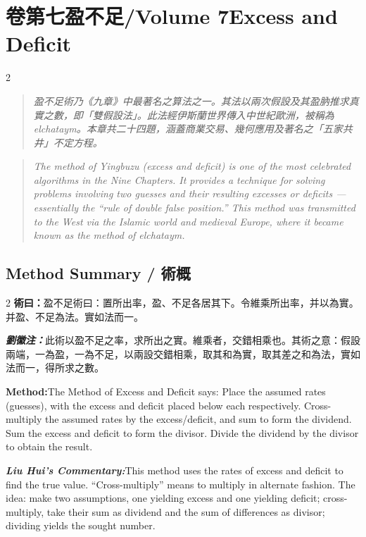 \documentclass[11pt,a4paper]{article}
\newcommand{\cnshu}{\textcolor{cnlabelfg}{\textbf{術曰：}}}
\newcommand{\cnzhu}{\textcolor{commentarycolor}{\textit{\textbf{劉徽注：}}}}
\newcommand{\enshu}{\textcolor{enlabelfg}{\textbf{Method:}}}
\newcommand{\enzhu}{\textcolor{enlabelfg}{\textit{\textbf{Liu Hui's Commentary:}}}}
\begin{document}
\newpage

\newpage
\section*{卷第七\quad 盈不足\quad /\quad Volume 7\quad Excess and Deficit}

\begin{paracol}{2}
\switchcolumn[0]
\begin{quote}\color{quotecolor}\small
\textit{盈不足術乃《九章》中最著名之算法之一。其法以兩次假設及其盈肭推求真實之數，即「雙假設法」。此法經伊斯蘭世界傳入中世紀歐洲，被稱為 elchataym。本章共二十四題，涵蓋商業交易、幾何應用及著名之「五家共井」不定方程。}
\end{quote}
\switchcolumn[1]
\begin{quote}\color{quotecolor}\small
\textit{The method of Yingbuzu (excess and deficit) is one of the most celebrated algorithms in the Nine Chapters. It provides a technique for solving problems involving two guesses and their resulting excesses or deficits --- essentially the ``rule of double false position.'' This method was transmitted to the West via the Islamic world and medieval Europe, where it became known as the method of elchataym.}
\end{quote}
\end{paracol}

\subsection*{Method Summary / 術概}

\begin{paracol}{2}
\switchcolumn[0]
\cnshu 盈不足術曰：置所出率，盈、不足各居其下。令維乘所出率，并以為實。并盈、不足為法。實如法而一。

\cnzhu 此術以盈不足之率，求所出之實。維乘者，交錯相乘也。其術之意：假設兩端，一為盈，一為不足，以兩設交錯相乘，取其和為實，取其差之和為法，實如法而一，得所求之數。

\switchcolumn[1]
\enshu The Method of Excess and Deficit says: Place the assumed rates (guesses), with the excess and deficit placed below each respectively. Cross-multiply the assumed rates by the excess/deficit, and sum to form the dividend. Sum the excess and deficit to form the divisor. Divide the dividend by the divisor to obtain the result.

\enzhu This method uses the rates of excess and deficit to find the true value. ``Cross-multiply'' means to multiply in alternate fashion. The idea: make two assumptions, one yielding excess and one yielding deficit; cross-multiply, take their sum as dividend and the sum of differences as divisor; dividing yields the sought number.
\end{paracol}
\end{document}
